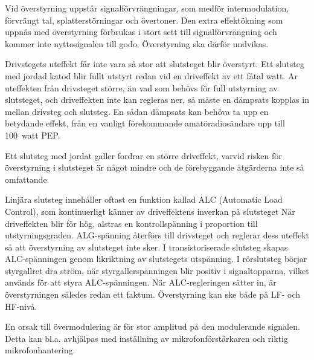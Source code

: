 Vid överstyrning uppstår signalförvrängningar, som medför
intermodulation, förvrängt tal, splatterstörningar och övertoner. Den
extra effektökning som uppnås med överstyrning förbrukas i stort sett
till signalförvrängning och kommer inte nyttosignalen till
godo. Överstyrning ska därför undvikas.

Drivstegets uteffekt får inte vara så stor att slutsteget blir
överstyrt. Ett slutsteg med jordad katod blir fullt utstyrt redan vid
en driveffekt av ett fåtal watt. Ar uteffekten från drivsteget större,
än vad som behövs för full utstyrning av slutsteget, och driveffekten
inte kan regleras ner, så måste en dämpsats kopplas in mellan drivsteg
och slutsteg. En sådan dämpsats kan behöva ta upp en betydande effekt,
från en vanligt förekommande amatöradiosändare upp till 100~watt PEP.

Ett slutsteg med jordat galler fordrar en större driveffekt, varvid
risken för överstyrning i slutsteget är något mindre och de
förebyggande åtgärderna inte så omfattande.

Linjära slutsteg innehåller oftast en funktion kallad ALC (Automatic
Load Control), som kontinuerligt känner av driveffektens inverkan på
slutsteget När driveffekten blir för hög, alstras en kontrollspänning
i proportion till utstyrningsgraden. ALG-spänning återförs till
drivsteget och reglerar dess uteffekt så att överstyrning av
slutsteget inte sker. I transistoriserade slutsteg skapas
ALC-spänningen genom likriktning av slutstegets utspänning.
I rörslutsteg börjar styrgallret dra ström, när styrgallerspänningen
blir positiv i signaltopparna, vilket används för att styra
ALC-spänningen. När ALC-regleringen sätter in, är överstyrningen
således redan ett faktum. Överstyrning kan ske både på LF- och HF-nivå.

En orsak till övermodulering är för stor amplitud på den modulerande
signalen. Detta kan bl.a. avhjälpas med inställning av
mikrofonförstärkaren och riktig mikrofonhantering.
